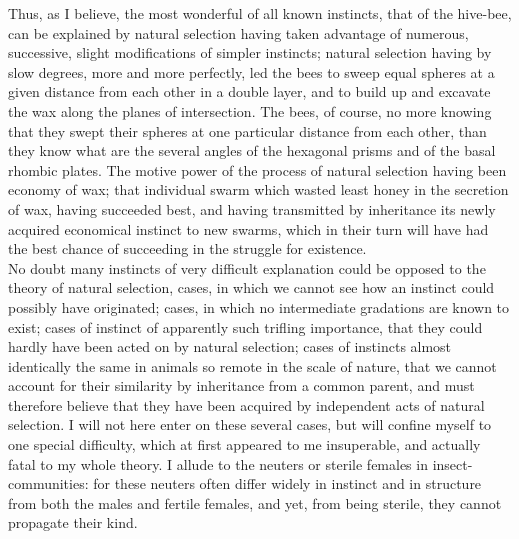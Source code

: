 \indent Thus, as I believe, the most wonderful of all known instincts, that of the hive-bee, can be explained by natural selection having taken advantage of numerous, successive, slight modifications of simpler instincts; natural selection having by slow degrees, more and more perfectly, led the bees to sweep equal spheres at a given distance from each other in a double layer, and to build up and excavate the wax along the planes of intersection. The bees, of course, no more knowing that they swept their spheres at one particular distance from each other, than they know what are the several angles of the hexagonal prisms and of the basal rhombic plates. The motive power of the process of natural selection having been economy of wax; that individual swarm which wasted least honey in the secretion of wax, having succeeded best, and having transmitted by inheritance its newly acquired economical instinct to new swarms, which in their turn will have had the best chance of succeeding in the struggle for existence. \\
\indent No doubt many instincts of very difficult explanation could be opposed to the theory of natural selection, cases, in which we cannot see how an instinct could possibly have originated; cases, in which no intermediate gradations are known to exist; cases of instinct of apparently such trifling importance, that they could hardly have been acted on by natural selection; cases of instincts almost identically the same in animals so remote in the scale of nature, that we cannot account for their similarity by inheritance from a common parent, and must therefore believe that they have been acquired by independent acts of natural selection. I will not here enter on these several cases, but will confine myself to one special difficulty, which at first appeared to me insuperable, and actually fatal to my whole theory. I allude to the neuters or sterile females in insect-communities: for these neuters often differ widely in instinct and in structure from both the males and fertile females, and yet, from being sterile, they cannot propagate their kind.\\
